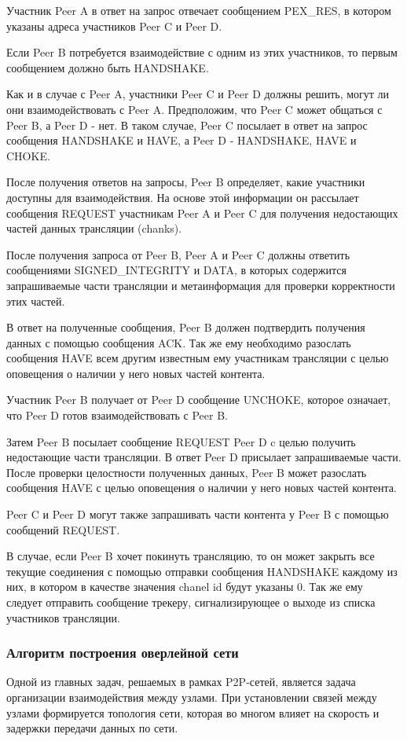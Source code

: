 		Участник Peer A в ответ на запрос отвечает сообщением PEX\_RES, в котором указаны адреса
		участников Peer C и Peer D.

		Если Peer B потребуется взаимодействие с одним из этих участников, то первым сообщением должно быть
		HANDSHAKE.

		Как и в случае с Peer A, участники Peer C и Peer D должны решить, могут ли они
		взаимодействовать с Peer A. Предположим, что Peer C может общаться с Peer B, а
		Peer D - нет. В таком случае, Peer C посылает в ответ на запрос сообщения HANDSHAKE и
		HAVE, а Peer D - HANDSHAKE, HAVE и CHOKE.

		После получения ответов на запросы, Peer B определяет, какие участники доступны для взаимодействия.
		На основе этой информации он рассылает сообщения REQUEST участникам Peer A и Peer C
		для получения недостающих частей данных трансляции (chanks).

		После получения запроса от Peer B, Peer A и Peer C должны ответить сообщениями
		SIGNED\_INTEGRITY и DATA, в которых содержится запрашиваемые части трансляции и метаинформация
		для проверки корректности этих частей.

		В ответ на полученные сообщения, Peer B должен подтвердить получения данных с помощью сообщения
		ACK. Так же ему необходимо разослать сообщения HAVE всем другим известным ему участникам
		трансляции с целью оповещения о наличии у него новых частей контента.

		Участник Peer B получает от Peer D сообщение UNCHOKE, которое означает, что
		Peer D готов взаимодействовать с Peer B.

		Затем Peer B посылает сообщение REQUEST Peer D c целью получить недостающие части
		трансляции. В ответ Peer D присылает запрашиваемые части. После проверки целостности полученных данных,
		Peer B может разослать сообщения HAVE с целью оповещения о наличии у него новых частей
		контента.

		Peer C и Peer D могут также запрашивать части контента у Peer B с помощью сообщений
		REQUEST.

		В случае, если Peer B хочет покинуть трансляцию, то он может закрыть все текущие соединения с помощью
		отправки сообщения HANDSHAKE каждому из них, в котором в качестве значения chanel id будут
		указаны 0. Так же ему следует отправить сообщение трекеру, сигнализирующее о выходе из списка участников
		трансляции.

		\subsubsection{Алгоритм построения оверлейной сети}
		Одной из главных задач, решаемых в рамках P2P-сетей, является задача организации взаимодействия между узлами.
		При установлении связей между узлами формируется топология сети, которая во многом влияет на скорость и задержки
		передачи данных по сети.

